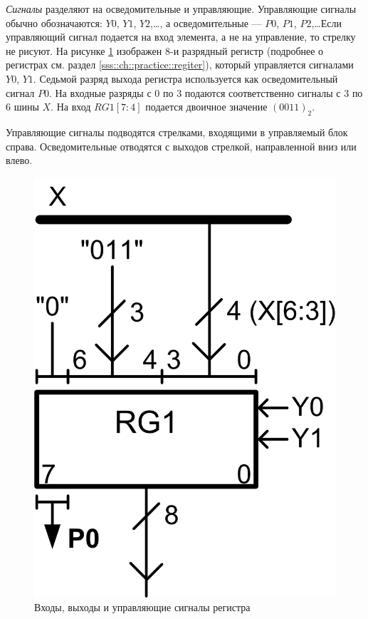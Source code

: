 \emph{Сигналы} разделяют на осведомительные и управляющие. Управляющие сигналы обычно обозначаются: $Y0$, $Y1$, $Y2$,\ldots, а осведомительные --- $P0$, $P1$, $P2$,\ldots Если управляющий сигнал подается на вход элемента, а не на управление, то стрелку не рисуют.  На рисунке \ref{fig::ch::practice::controls} изображен $8$-и разрядный регистр (подробнее о регистрах см. раздел \ref{sss::ch::practice::regiter}), который управляется сигналами $Y0$, $Y1$. Седьмой разряд выхода регистра используется как осведомительный сигнал $P0$. На входные разряды с $0$ по $3$ подаются соответственно сигналы с $3$ по $6$ шины $X$. На вход $RG1[7:4]$ подается двоичное значение $(0011)_2$.

Управляющие сигналы подводятся стрелками, входящими в управляемый блок справа. Осведомительные отводятся с выходов стрелкой, направленной вниз или влево.

\begin{figure}[!ht]
    \centering
    \includegraphics{fig/controls}
    \caption{Входы, выходы и управляющие сигналы регистра}
    \label{fig::ch::practice::controls}
\end{figure}

